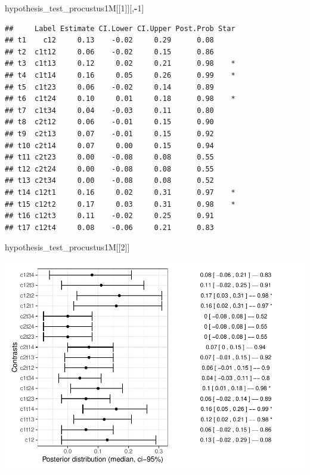 \documentclass[
]{article}
\newenvironment{Shaded}{\begin{snugshade}}{\end{snugshade}}
\newcommand{\DecValTok}[1]{\textcolor[rgb]{0.00,0.00,0.81}{#1}}
\newcommand{\NormalTok}[1]{#1}
\newcommand{\SpecialCharTok}[1]{\textcolor[rgb]{0.81,0.36,0.00}{\textbf{#1}}}
\begin{document}
\begin{Shaded}
\begin{Highlighting}[]
\NormalTok{hypothesis\_test\_procustus1M[[}\DecValTok{1}\NormalTok{]][,}\SpecialCharTok{{-}}\DecValTok{1}\NormalTok{]}
\end{Highlighting}
\end{Shaded}

\begin{verbatim}
##     Label Estimate CI.Lower CI.Upper Post.Prob Star
## t1    c12     0.13    -0.02     0.29      0.08     
## t2  c1t12     0.06    -0.02     0.15      0.86     
## t3  c1t13     0.12     0.02     0.21      0.98    *
## t4  c1t14     0.16     0.05     0.26      0.99    *
## t5  c1t23     0.06    -0.02     0.14      0.89     
## t6  c1t24     0.10     0.01     0.18      0.98    *
## t7  c1t34     0.04    -0.03     0.11      0.80     
## t8  c2t12     0.06    -0.01     0.15      0.90     
## t9  c2t13     0.07    -0.01     0.15      0.92     
## t10 c2t14     0.07     0.00     0.15      0.94     
## t11 c2t23     0.00    -0.08     0.08      0.55     
## t12 c2t24     0.00    -0.08     0.08      0.55     
## t13 c2t34     0.00    -0.08     0.08      0.52     
## t14 c12t1     0.16     0.02     0.31      0.97    *
## t15 c12t2     0.17     0.03     0.31      0.98    *
## t16 c12t3     0.11    -0.02     0.25      0.91     
## t17 c12t4     0.08    -0.06     0.21      0.83
\end{verbatim}

\begin{Shaded}
\begin{Highlighting}[]
\NormalTok{hypothesis\_test\_procustus1M[[}\DecValTok{2}\NormalTok{]]}
\end{Highlighting}
\end{Shaded}

\includegraphics{08_Publish_GUSO_ASIL_files/figure-latex/Contrasts1M-1.pdf}
\end{document}
